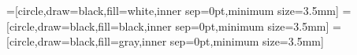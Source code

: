 \begingroup
	=[circle,draw=black,fill=white,inner sep=0pt,minimum size=3.5mm]
	=[circle,draw=black,fill=black,inner sep=0pt,minimum size=3.5mm]
	=[circle,draw=black,fill=gray,inner sep=0pt,minimum size=3.5mm]
\endgroup